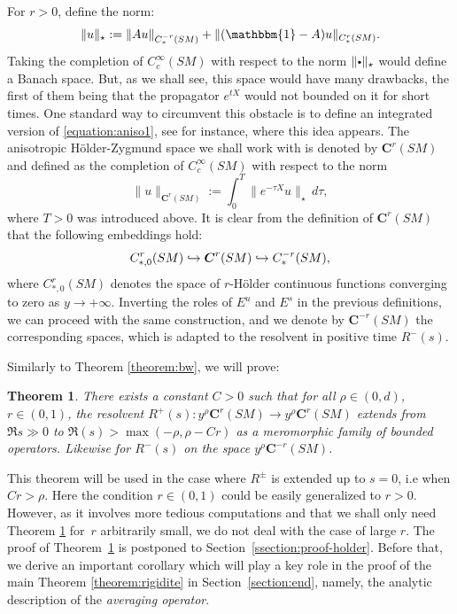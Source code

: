 \documentclass[JEP,XML,SOM,Unicode,NoFloatCountersInSection]{cedram}
\newcommand\hto{\mathrel{\lhook\joinrel\to}}
\newcommand{\sbullet}{{\scriptscriptstyle\bullet}}
\newcommand{\csbullet}{{\raisebox{1pt}{$\sbullet$}}}
\newcommand{\bC}{\boldsymbol{C}}
\theoremstyle{plain}
\newtheorem{theorem}{Theorem}[section]
\theoremstyle{definition}
\begin{document}
For $r > 0$, define the norm:
\begin{equation}
\label{equation:aniso1}
\|u\|_{\star} := \|Au\|_{C^{-r}_*(SM)} + \|(\mathbbm{1}-A)u\|_{C^r_*(SM)}.
\end{equation}
Taking the completion of $C^\infty_{c}(SM)$ with respect to the norm $\|\csbullet\|_{\star}$ would define a Banach space. But, as we shall see, this space would have many drawbacks, the first of them being that the propagator $e^{tX}$ would not bounded on it for short times. One standard way to circumvent this obstacle is to define an integrated version of \eqref{equation:aniso1}, see \cite{Baladi-Tsujii-08,Adam-Baladi-21} for instance, where this idea appears. The anisotropic Hölder-Zygmund space we shall work with is denoted by $\bC^r(SM)$ and defined as the completion of $C^\infty_{c}(SM)$ with respect to the norm
\begin{equation}
\label{equation:aniso2}
\|u\|_{\bC^r(SM)} := \int_0^T \|e^{-\tau X}u\|_{\star}\, d\tau,
\end{equation}
where $T > 0$ was introduced above. It is clear from the definition of $\bC^r(SM)$ that the following embeddings hold:
\begin{equation}
\label{equation:embedding-plot2}
C^r_{*,0}(SM) \hto \bC^r(SM) \hto C^{-r}_*(SM),
\end{equation}
where $C^r_{*,0}(SM)$ denotes the space of $r$-Hölder continuous functions converging to zero as $y \to +\infty$. Inverting the roles of $E^u$ and $E^s$ in the previous definitions, we can proceed with the same construction, and we denote by $\bC^{-r}(SM)$ the corresponding spaces, which is adapted to the resolvent in positive time $R^-(s)$.

Similarly to Theorem \ref{theorem:bw}, we will prove:
\begin{theorem}
\label{thm:continuation-resolvent-holder}
There exists a constant $C>0$ such that for all $\rho \in (0,d)$, $r \in (0,1)$, the resolvent $R^+(s) : y^\rho \bC^r(SM) \to y^\rho \bC^r(SM)$ extends from $\Re s \gg 0$ to $\Re(s) > \max(-\rho,\rho-Cr)$ as a meromorphic family of bounded operators. {\color{black}Likewise for $R^-(s)$ on the space $y^\rho \bC^{-r}(SM)$.}
\end{theorem}

{\color{black}This theorem will be used in the case where $R^{\pm}$ is extended up to $s=0$, i.e when $Cr > \rho$.} Here the condition $r\in (0,1)$ could be easily generalized to $r>0$. However, as it involves more tedious computations and that we shall only need Theorem \ref{thm:continuation-resolvent-holder} for~$r$ arbitrarily small, we do not deal with the case of large $r$. The proof of Theorem~\ref{thm:continuation-resolvent-holder} is postponed to Section~\ref{ssection:proof-holder}. Before that, we derive an important corollary which will play a key role in the proof of the main Theorem \ref{theorem:rigidite} in Section~\ref{section:end}, namely, the analytic description of the \emph{averaging operator}.
\end{document}
